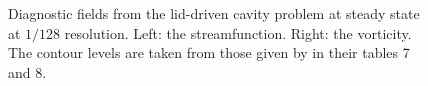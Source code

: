  

\begin{figure}
\centering
{}
\caption{Diagnostic fields from the lid-driven cavity problem at steady state at $1/128$ resolution.
Left: the streamfunction. Right: the vorticity. The contour levels are taken from those given by \cite{botella1998} in their tables
7 and 8.}
\label{fig:driven_cavity1}
\end{figure}


